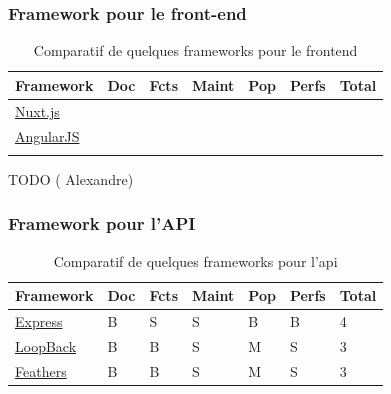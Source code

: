 \subsubsection*{Framework pour le front-end}
\begin{table}[H]
    \centering
    \begin{tabular}{| l | l | l | l | l | l | l |}
    \hline
        Framework & Doc & Fcts & Maint & Pop & Perfs & Total \\
    \hline
        \href{https://nuxtjs.org/}{Nuxt.js} &
        &  
        &
        &            
        &              
        &       \\
    \hline
        \href{https://angularjs.org/}{AngularJS} &
        &                
        &   
        &
        &              
        &       \\
    \hline
        \href{}{} &
        &                
        &     
        &
        &              
        &       \\  
    \hline
    \end{tabular}
    \caption{Comparatif de quelques frameworks pour le \Gls{frontend}}
    \label{table:compFrameworksFrontend}
\end{table}

TODO ( Alexandre)

\subsubsection*{Framework pour l'API}


\begin{table}[H]
    \centering
    \begin{tabular}{| l | l | l | l | l | l | l |}
    \hline
        Framework & Doc & Fcts & Maint & Pop & Perfs & Total \\
    \hline
        \href{https://expressjs.com/}{Express} &
        B &  
        S &
        S &            
        B &              
        B &
        4 \\
    \hline
        \href{https://loopback.io/}{LoopBack} &
        B &                
        B &   
        S &
        M &              
        S &      
        3 \\
    \hline
        \href{https://feathersjs.com/}{Feathers} &
        B &                
        B &     
        S &
        M &              
        S &       
        3 \\  
    \hline
    \end{tabular}
    \caption{Comparatif de quelques frameworks pour l'\Gls{api}}
    \label{table:compFrameworksAPI}
\end{table}

